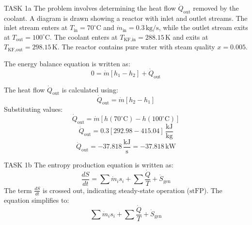 TASK 1a  
The problem involves determining the heat flow \( \dot{Q}_{\text{out}} \) removed by the coolant. A diagram is drawn showing a reactor with inlet and outlet streams. The inlet stream enters at \( T_{\text{in}} = 70^\circ\text{C} \) and \( \dot{m}_{\text{in}} = 0.3 \, \text{kg/s} \), while the outlet stream exits at \( T_{\text{out}} = 100^\circ\text{C} \). The coolant enters at \( T_{\text{KF,in}} = 288.15 \, \text{K} \) and exits at \( T_{\text{KF,out}} = 298.15 \, \text{K} \). The reactor contains pure water with steam quality \( x = 0.005 \).  

The energy balance equation is written as:  
\[
0 = \dot{m} \left[ h_1 - h_2 \right] + \dot{Q}_{\text{out}}
\]  

The heat flow \( \dot{Q}_{\text{out}} \) is calculated using:  
\[
\dot{Q}_{\text{out}} = \dot{m} \left[ h_2 - h_1 \right]
\]  
Substituting values:  
\[
\dot{Q}_{\text{out}} = \dot{m} \left[ h(70^\circ\text{C}) - h(100^\circ\text{C}) \right]
\]  
\[
\dot{Q}_{\text{out}} = 0.3 \left[ 292.98 - 415.04 \right] \, \frac{\text{kJ}}{\text{kg}}
\]  
\[
\dot{Q}_{\text{out}} = -37.818 \, \frac{\text{kJ}}{\text{s}} = -37.818 \, \text{kW}
\]  

TASK 1b  
The entropy production equation is written as:  
\[
\frac{dS}{dt} = \sum \dot{m}_i s_i + \sum \frac{\dot{Q}}{T} + \dot{S}_{\text{gen}}
\]  
The term \( \frac{dS}{dt} \) is crossed out, indicating steady-state operation (\( \text{stFP} \)). The equation simplifies to:  
\[
\sum \dot{m}_i s_i + \sum \frac{\dot{Q}}{T} + \dot{S}_{\text{gen}}
\]
